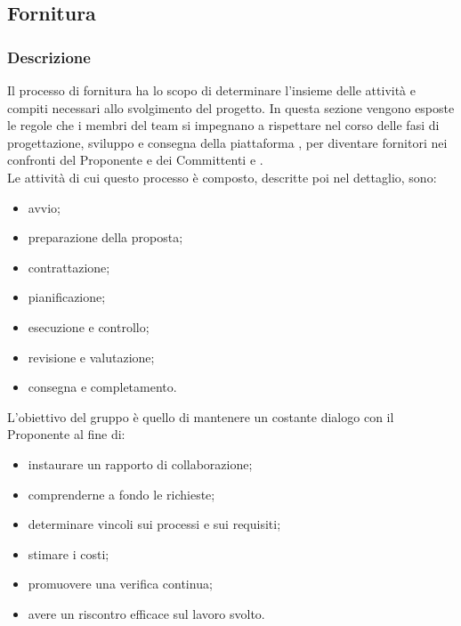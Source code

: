 \subsection{Fornitura}
    \subsubsection{Descrizione}
     Il processo di fornitura ha lo scopo di determinare l'insieme delle attività e compiti necessari allo svolgimento del progetto. 
     In questa sezione vengono esposte le regole che i membri del team \Gruppo{} si impegnano a rispettare nel corso delle fasi di progettazione, sviluppo e consegna della piattaforma \NomeProgetto{}, per diventare fornitori nei confronti del Proponente \Proponente{} e dei Committenti \TV{} e \RC{}. \\
     Le attività di cui questo processo è composto, descritte poi nel dettaglio, sono:
     \begin{itemize}
        	\item{avvio;}
        	\item{preparazione della proposta;}
        	\item{contrattazione;}
        	\item{pianificazione;}
        	\item{esecuzione e controllo;}
        	\item{revisione e valutazione;}
        	\item{consegna e completamento.}
     \end{itemize}
     L'obiettivo del gruppo è quello di mantenere un costante dialogo con il Proponente al fine di:
     \begin{itemize}
	\item{instaurare un rapporto di collaborazione;} 
	\item{comprenderne a fondo le richieste;}
	\item{determinare vincoli sui processi e sui requisiti;}
	\item{stimare i costi;}
	\item{promuovere una verifica continua;}
	\item{avere un riscontro efficace sul lavoro svolto.}
     \end{itemize}
    
